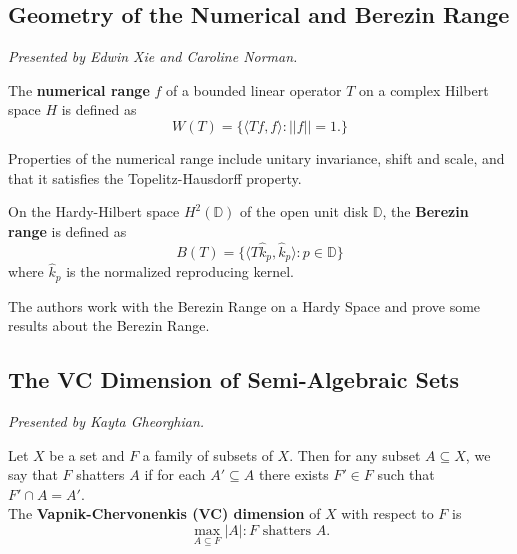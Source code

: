 \documentclass[12pt]{amsart}
\begin{document}
\vspace{2cm}

\subsection{Geometry of the Numerical and Berezin Range}

\textit{}
\vspace{0.25cm}

\textit{Presented by Edwin Xie and Caroline Norman.}

\begin{definition}
The \textbf{numerical range} $f$ of a bounded linear operator $T$ on a complex Hilbert space $H$ is defined as
\[ W(T) = \{\langle Tf, f \rangle : ||f|| = 1.\} \]

Properties of the numerical range include unitary invariance, shift and scale, and that it satisfies the Topelitz-Hausdorff property.
\end{definition}

\begin{definition}
On the Hardy-Hilbert space $H^2(\mathbb{D})$ of the open unit disk $\mathbb{D}$, the \textbf{Berezin range} is defined as 
\[B(T) = \{ \langle T\hat{k}_p, \hat{k}_p \rangle : p \in \mathbb{D}\}\]
where $\hat{k}_p$ is the normalized reproducing kernel.

\end{definition}
\begin{result*}
The authors work with the Berezin Range on a Hardy Space and prove some results about the Berezin Range.
\end{result*}

\vspace{2cm}

\newpage

\subsection{The VC Dimension of Semi-Algebraic Sets}

\textit{}
\vspace{0.25cm}

\textit{Presented by Kayta Gheorghian.}

\begin{definition}[VC Dimension]
Let $X$ be a set and $F$ a family of subsets of $X$. Then for any subset
$A \subseteq X$, we say that $F$ shatters $A$ if for each $A' \subseteq A$ there exists $F' \in F$ such that $F' \cap A = A'.$ \\

The \textbf{Vapnik-Chervonenkis (VC) dimension} of $X$ with respect to $F$ is
\[ \max_{A \subseteq F} |A| : F \text{ shatters } A.\]
\end{definition}
\end{document}

